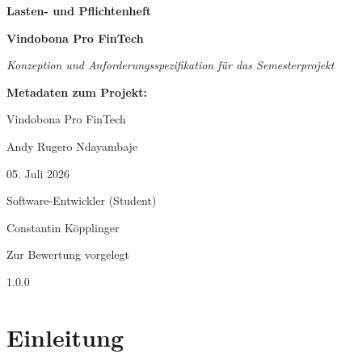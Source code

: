\documentclass[11pt,a4paper]{article}
\begin{document}
\begin{tcolorbox}[
    colback=primaryblue,
    colframe=primaryblue,
    arc=6pt,
    left=20pt,
    right=20pt,
    top=30pt,
    bottom=30pt,
    coltext=white
]
    \centering
    {\huge\bfseries Lasten- und Pflichtenheft \par}
    \vspace{10pt}
    {\Large\bfseries Vindobona Pro FinTech \par}
    \vspace{15pt}
    {\large\itshape Konzeption und Anforderungsspezifikation für das Semesterprojekt \par}
\end{tcolorbox}

\vspace{40pt}

\begin{tcolorbox}[
    colback=bglight,
    colframe=bordergray,
    arc=4pt,
    left=15pt,
    right=15pt,
    top=15pt,
    bottom=15pt
]
    \textbf{\color{accentblue}Metadaten zum Projekt:}
    \vspace{8pt}
    \begin{description}[leftmargin=2.2cm, labelwidth=2.0cm]
        \item[\textbf{Projektname:}] Vindobona Pro FinTech
        \item[\textbf{Verfasser:}] Andy Rugero Ndayambaje
        \item[\textbf{Datum:}] 05. Juli 2026
        \item[\textbf{Rolle:}] Software-Entwickler (Student)
        \item[\textbf{Fachbetreuer:}] Constantin Köpplinger
        \item[\textbf{Status:}] Zur Bewertung vorgelegt
        \item[\textbf{Version:}] 1.0.0
    \end{description}
\end{tcolorbox}

\newpage

\tableofcontents
\newpage

\section{Einleitung}
\end{document}
